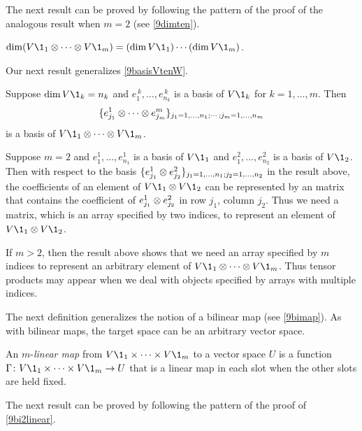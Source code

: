 The next result can be proved by following the pattern of the proof of the analogous result when $m = 2$ (see \ref{9dimten}).

{$\dim (V\1_1 \tensor \cdots \tensor V\1_m) = (\dim V\1_1) \cdots (\dim V\1_m)$.}

Our next result generalizes \ref{9basisVtenW}.

{Suppose $\dim V\1_k = n_k$ and $e_1^{\,k}, \ldots, e_{n_k}^{\,k}$ is a basis of $V\1_k$ for $k = 1, \ldots, m$. Then
\vspace{-.04in} %
\[
\br{e_{j_1}^1 \tensor \cdots \tensor e_{j_m}^m}_{j_1 = 1, \ldots, n_1; \cdots ; j_m = 1, \ldots, n_m}
\vspace{-.04in} %
\]
is a basis of $V\1_1 \tensor \cdots \tensor V\1_m$.
}

Suppose $m = 2$ and $e_1^1, \ldots, e_{n_1}^1$ is a basis of $V\1_1$ and $e_1^2, \ldots, e_{n_2}^2$ is a basis of $V\1_2$. Then with respect to the basis $\{e_{j_1}^1 \otimes e_{j_2}^2\}_{j_1 = 1, \ldots, n_1; j_2 = 1, \ldots, n_2}$ in the result above, the coefficients of an element of $V\1_1 \tensor V\1_2$ can be represented by an  matrix that contains the coefficient of $e_{j_1}^1 \otimes e_{j_2}^2$ in row $j_1$, column $j_2$. Thus we need a matrix, which is an array specified by two indices, to represent an element of $V\1_1 \tensor V\1_2$.

If $m > 2$, then the result above shows that we need an array specified by $m$ indices to represent an arbitrary element of $V\1_1 \tensor \cdots \tensor V\1_m$. Thus tensor products may appear when we deal with objects specified by arrays with multiple indices.

The next definition generalizes the notion of a bilinear map (see \ref{9bimap}). As with bilinear maps, the target space can be an arbitrary vector space.

{An $m$-\emph{linear map} from $V\1_1 \times \cdots \times V\1_m$ to a vector space $U$ is a function
$\fun \Gamma {V\1_1 \times \cdots \times V\1_m} U$ that is a linear map in each slot when the other slots are held fixed.
}

\pagebreak[3]

The next result can be proved by following the pattern of the proof of \ref{9bi2linear}.

